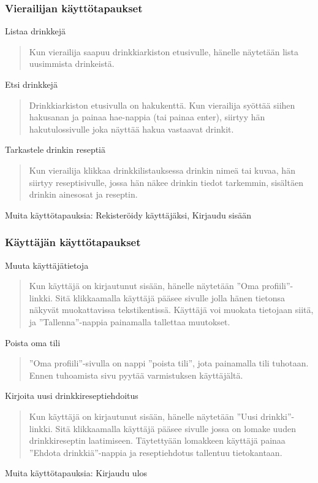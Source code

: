 \documentclass[a4paper]{article}
\begin{document}
\subsubsection{Vierailijan käyttötapaukset}
Listaa drinkkejä
\begin{quote}
  Kun vierailija saapuu drinkkiarkiston etusivulle, hänelle näytetään lista uusimmista drinkeistä.
\end{quote}
Etsi drinkkejä
\begin{quote}
  Drinkkiarkiston etusivulla on hakukenttä. Kun vierailija syöttää siihen hakusanan ja painaa hae-nappia (tai painaa enter), siirtyy hän hakutulossivulle joka näyttää hakua vastaavat drinkit.
\end{quote}
Tarkastele drinkin reseptiä
\begin{quote}
  Kun vierailija klikkaa drinkkilistauksessa drinkin nimeä tai kuvaa, hän siirtyy reseptisivulle, jossa hän näkee drinkin tiedot tarkemmin, sisältäen drinkin ainesosat ja reseptin.
\end{quote}
Muita käyttötapauksia: Rekisteröidy käyttäjäksi, Kirjaudu sisään

\subsubsection{Käyttäjän käyttötapaukset}
Muuta käyttäjätietoja
\begin{quote}
  Kun käyttäjä on kirjautunut sisään, hänelle näytetään ''Oma profiili''-linkki. Sitä klikkaamalla käyttäjä pääsee sivulle jolla hänen tietonsa näkyvät muokattavissa tekstikentissä. Käyttäjä voi muokata tietojaan siitä, ja ''Tallenna''-nappia painamalla tallettaa muutokset.
\end{quote}
Poista oma tili
\begin{quote}
  ''Oma profiili''-sivulla on nappi ''poista tili'', jota painamalla tili tuhotaan. Ennen tuhoamista sivu pyytää varmistuksen käyttäjältä.
\end{quote}
Kirjoita uusi drinkkireseptiehdoitus
\begin{quote}
  Kun käyttäjä on kirjautunut sisään, hänelle näytetään ''Uusi drinkki''-linkki. Sitä klikkaamalla käyttäjä pääsee sivulle jossa on lomake uuden drinkkireseptin laatimiseen. Täytettyään lomakkeen käyttäjä painaa ''Ehdota drinkkiä''-nappia ja reseptiehdotus tallentuu tietokantaan.
\end{quote}
Muita käyttötapauksia: Kirjaudu ulos
\end{document}
